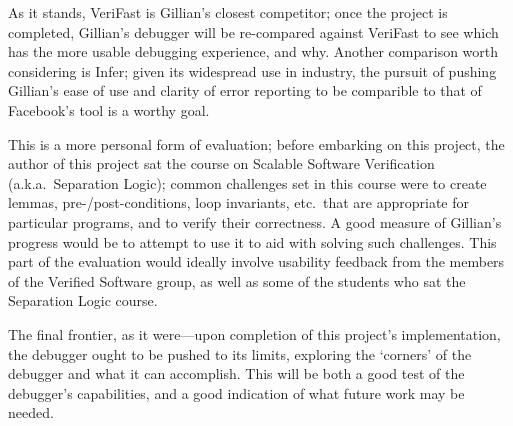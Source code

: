 As it stands, VeriFast is Gillian's closest competitor; once the project is
completed, Gillian's debugger will be re-compared against VeriFast to see which
has the more usable debugging experience, and why. Another comparison worth
considering is Infer; given its widespread use in industry, the pursuit of
pushing Gillian's ease of use and clarity of error reporting to be comparible
to that of Facebook's tool is a worthy goal.

This is a more personal form of evaluation; before embarking on this project,
the author of this project sat the course on Scalable Software Verification (a.k.a.~Separation Logic); common challenges set in this course were to create lemmas,
pre-/post-conditions, loop invariants, etc.\ that are appropriate for particular
programs, and to verify their correctness. A good measure of Gillian's progress
would be to attempt to use it to aid with solving such challenges. 
This part of the evaluation would ideally involve usability feedback from the members of the Verified Software group, as well as some of the students who sat the Separation Logic course.

The final frontier, as it were---upon completion of this project's
implementation, the debugger ought to be pushed to its limits, exploring the
`corners' of the debugger and what it can accomplish. This will be both a good
test of the debugger's capabilities, and a good indication of what future work
may be needed.

